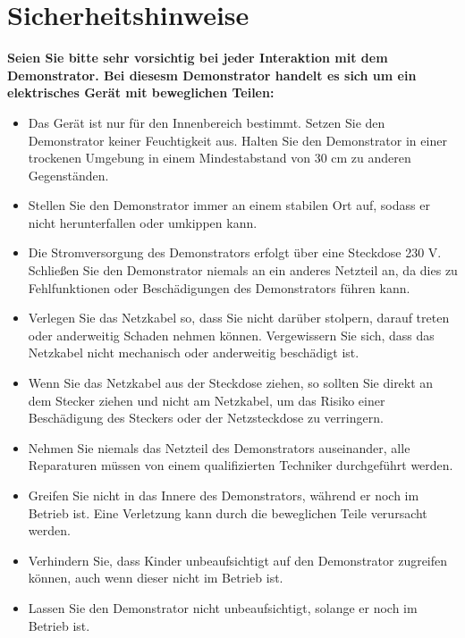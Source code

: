 \documentclass[a4paper,12pt,final]{report}
\begin{document}
	\setcounter{page}{-1}  
	
	
	\tableofcontents
	\listoffigures
	\listoftables
	
	\cleardoublepage         
	\setcounter{page}{1} 
	
	
	\chapter{Sicherheitshinweise}
			\textbf{Seien Sie bitte sehr vorsichtig bei jeder Interaktion mit dem Demonstrator. Bei diesesm Demonstrator handelt es sich um ein elektrisches Gerät mit beweglichen Teilen:}
	\begin{itemize}[leftmargin=1.5em]

		
		\item Das Gerät ist nur für den Innenbereich bestimmt. Setzen Sie den Demonstrator keiner Feuchtigkeit aus.
		Halten Sie den Demonstrator in einer trockenen Umgebung in einem Mindestabstand von 30 cm zu anderen
		Gegenständen.
		
		\item Stellen Sie den Demonstrator immer an einem stabilen Ort auf, sodass er nicht herunterfallen oder umkippen kann.
		
		\item Die Stromversorgung des Demonstrators erfolgt über eine Steckdose 230 V. Schließen Sie den Demonstrator niemals an ein anderes Netzteil an, da dies zu Fehlfunktionen oder Beschädigungen des Demonstrators führen kann.
		
		\item Verlegen Sie das Netzkabel so, dass Sie nicht darüber stolpern, darauf treten oder anderweitig Schaden nehmen	können. Vergewissern Sie sich, dass das Netzkabel nicht mechanisch oder anderweitig beschädigt ist.
		
		\item Wenn Sie das Netzkabel aus der Steckdose ziehen, so sollten Sie direkt an dem Stecker ziehen und nicht am	Netzkabel, um das Risiko einer Beschädigung des Steckers oder der Netzsteckdose zu verringern.
		
		\item Nehmen Sie niemals das Netzteil des Demonstrators auseinander, alle Reparaturen müssen von einem qualifizierten Techniker durchgeführt werden.
		
		\item Greifen Sie nicht in das Innere des Demonstrators, während er noch im Betrieb ist. Eine Verletzung kann durch die beweglichen Teile verursacht werden.
		
		\item Verhindern Sie, dass Kinder unbeaufsichtigt auf den Demonstrator zugreifen können, auch wenn dieser nicht im Betrieb ist.
		
		\item Lassen Sie den Demonstrator nicht unbeaufsichtigt, solange er noch im Betrieb ist.
	\end{itemize}
	
\end{document}
